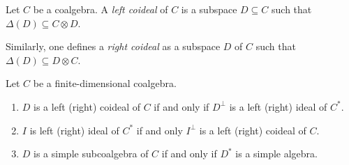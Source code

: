 \documentclass[12pt]{amsproc}
\begin{document}

\begin{definition}
    Let $C$ be a coalgebra. A \emph{left coideal} of $C$ 
    is a subspace $D\subseteq C$ such that 
    $\Delta(D)\subseteq C\otimes D$. 
\end{definition}

Similarly, one defines a \emph{right coideal} as a subspace
$D$ of $C$ such that $\Delta(D)\subseteq D\otimes C$. 

\begin{lemma}
\label{lem:correspondence}
    Let $C$ be a finite-dimensional coalgebra. 
    \begin{enumerate}
        \item $D$ is a left (right) coideal of $C$ 
        if and only if $D^\perp$ is a left  (right)
        ideal of $C^*$. 
        \item $I$ is left (right) ideal of $C^*$ if and only  
        $I^\perp$ is a left (right) coideal of $C$.
        \item $D$ is a simple subcoalgebra of $C$ 
        if and only if $D^*$ is a simple algebra. 
    \end{enumerate}
\end{lemma}
\end{document}
